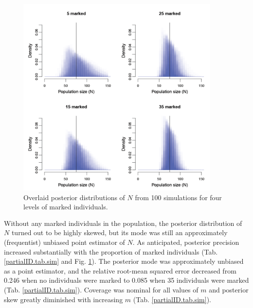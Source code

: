 \begin{figure}[ht]
  \centering
  \includegraphics[width=4in,height=4in]{Ch19-PartialID/figs/Nposts2.png}
  \caption{Overlaid posterior distributions of $N$ from 100 simulations
    for four levels of marked individuals.}
  \label{partialID.fig.nposts}
\end{figure}

Without any marked individuals in the population, the posterior
distribution of $N$ turned out to be highly skewed, but its mode was
still an approximately (frequentist) unbiased point estimator of
$N$. As anticipated, posterior precision increased substantially with
the proportion of marked individuals (Tab. \ref{partialID.tab.sim} and
Fig. \ref{partialID.fig.nposts}). The posterior mode was approximately
unbiased as a point estimator, and the relative root-mean squared
error decreased from 0.246 when no individuals were marked to 0.085
when 35 individuals were marked
(Tab. \ref{partialID.tab.sim}). Coverage was nominal for all values of
$m$ and posterior skew greatly diminished with increasing $m$ (Tab. \ref{partialID.tab.sim}).


